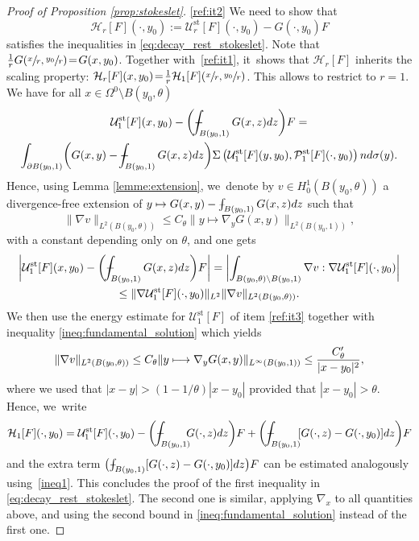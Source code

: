 \documentclass[JEP,XML,SOM,Unicode,NoEqCountersInSection,published]{cedram}
\newcommand\mto{\mathchoice{\longmapsto}{\mapsto}{\mapsto}{\mapsto}}
\newcommand{\st}{\mathrm{st}}
\def\Xint#1{\mathchoice
{\XXint\displaystyle\textstyle{#1}}%
{\XXint\textstyle\scriptstyle{#1}}%
{\XXint\scriptstyle\scriptscriptstyle{#1}}%
{\XXint\scriptscriptstyle\scriptscriptstyle{#1}}%
\!\int}
\def\XXint#1#2#3{{\setbox0=\hbox{$#1{#2#3}{\int}$ }
\vcenter{\hbox{$#2#3$ }}\kern-.6\wd0}}
\def\dashint{\Xint-}
\theoremstyle{plain}
\theoremstyle{definition}
\let\na\nabla
\begin{document}
\begin{proof}[Proof of Proposition \ref{prop:stokeslet}]
\eqref{ref:it2} We need to show that\vspace*{-3pt}
\[
\mathcal{H}_r[F](\cdot,y_0) :=\mathcal{U}^{\st}_{r}[F](\cdot,y_0) - G(\cdot,y_0) F
\]
satisfies the inequalities in \eqref{eq:decay_rest_stokeslet}. Note that $\frac{1}{r}G(\sfrac{x}{r},\sfrac{y_0}{r})\!=\!G(x,y_0)$. Together with~\eqref{ref:it1}, it~shows that $\mathcal{H}_r[F]$ inherits the scaling property:
$\mathcal{H}_{r}[F](x,y_0)\!=\! \frac{1}{r} \mathcal{H}_{1}[F](\sfrac{x}{r},\sfrac{y_0}{r})$.
This allows to restrict to $r=1$. We have for all $x \in \Omega^0 \setminus B(y_0,\theta)$\vspace*{-5pt}
\begin{multline*}
\mathcal{U}^{\st}_{1}[F](x,y_0) - \biggl(\dashint_{ B(y_0,1)} G(x,z) d z \biggr) F = \\
\int_{\partial B(y_0,1)} \biggl(G(x,y)-\dashint_{ B(y_0,1)} G(x,z) d z \biggr)\Sigma\left(\mathcal{U}^{\st}_{1}[F](y,y_0),\mathcal{P}^{\st}_1[F](\cdot,y_0)\right) n d \sigma (y).
\end{multline*}
Hence, using Lemma \ref{lemme:extension}, we~denote by $v\in H^1_0(B(y_0,\theta))$ a divergence-free extension of $y \mto G(x,y)-\dashint_{ B(y_0,1)} G(x,z) d z$ such that
\[
\| \nabla v \|_{L^2(B(y_0,\theta))} \leq C_\theta \|y\mapsto \nabla_y G(x,y) \|_{L^2(B(y_0,1))},
\]
with a constant depending only on $\theta$, and one gets\vspace*{-3pt}
\begin{multline*}
\biggl |\mathcal{U}^{\st}_{1}[F](x,y_0)- \biggl(\dashint_{ B(y_0,1)} G(x,z) d z \biggr) F \biggr|= \biggl |\int_{B(y_0,\theta)\setminus B(y_0,1)} \nabla v : \nabla \mathcal{U}^{\st}_{1}[F](\cdot,y_0) \biggr|\\
\leq \| \nabla \mathcal{U}^{\st}_{1}[F](\cdot,y_0)\|_{L^2} \| \nabla v \|_{L^2(B(y_0,\theta))}.
\end{multline*}
We then use the energy estimate for $ \mathcal{U}^{\st}_{1}[F]$ of item \eqref{ref:it3}
together with inequality \eqref{ineq:fundamental_solution} which yields\vspace*{-3pt}
\begin{equation}\label{ineq1}
\| \nabla v \|_{L^2(B(y_0,\theta))} \le C_\theta \|y\mto \nabla_y G(x,y)\|_{L^\infty(B(y_0,1))} \leq \frac{C'_\theta}{|x-y_0|^2},
\end{equation}
where we used that $|x-y|>(1-1/\theta)|x-y_0|$ provided that $|x-y_0|>\theta$. Hence, we~write\vspace*{-3pt}
\[
\mathcal{H}_1[F](\cdot,y_0) = \mathcal{U}^{\st}_{1}[F](\cdot,y_0) - \biggl(\dashint_{ B(y_0,1)}\hspace*{-2mm} G(\cdot,z) dz \biggr) F
+ \biggl(\dashint_{ B(y_0,1)}\hspace*{-1mm} [G(\cdot,z) - G(\cdot,y_0)] dz \biggr) F
\]
and the extra term $\bigl(\dashint_{ B(y_0,1)} [G(\cdot,z) - G(\cdot,y_0)] dz \bigr) F$ can be estimated analogously using~\eqref{ineq1}. This concludes the proof of the first inequality in \eqref{eq:decay_rest_stokeslet}. The second one is similar, applying $\na_x$ to all quantities above, and using the second bound in \eqref{ineq:fundamental_solution} instead of the first one.
\end{proof}
\end{document}
